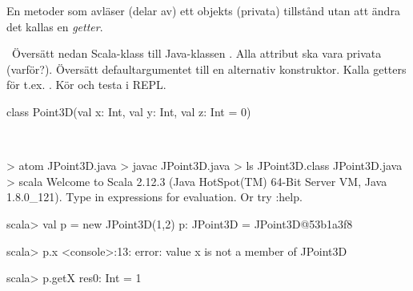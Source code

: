 \SubtaskSolved En metoder som avläser (delar av) ett objekts (privata) tillstånd utan att ändra det kallas en \emph{getter}.

\QUESTEND



\QUESTBEGIN

\Task \what~Översätt nedan Scala-klass till Java-klassen . Alla attribut ska vara privata (varför?). Översätt defaultargumentet till en alternativ konstruktor. Kalla getters för t.ex. . Kör  och testa i REPL.

\begin{Code}
class Point3D(val x: Int, val y: Int, val z: Int = 0)
\end{Code}

\SOLUTION

\TaskSolved \what~


\begin{REPL}
> atom JPoint3D.java
> javac JPoint3D.java
> ls
JPoint3D.class  JPoint3D.java
> scala
Welcome to Scala 2.12.3 (Java HotSpot(TM) 64-Bit Server VM, Java 1.8.0_121).
Type in expressions for evaluation. Or try :help.

scala> val p = new JPoint3D(1,2)
p: JPoint3D = JPoint3D@53b1a3f8

scala> p.x
<console>:13: error: value x is not a member of JPoint3D

scala> p.getX
res0: Int = 1
\end{REPL}

\QUESTEND



\QUESTBEGIN

